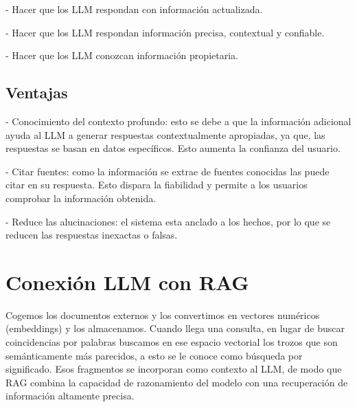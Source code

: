 - Hacer que los LLM respondan con información actualizada.

- Hacer que los LLM respondan información precisa, contextual y confiable.

- Hacer que los LLM conozcan información propietaria.

\subsection{Ventajas}

- Conocimiento del contexto profundo: esto se debe a que la información adicional ayuda al LLM a generar respuestas contextualmente apropiadas, ya que, las respuestas se basan en datos específicos. Esto aumenta la confianza del usuario.

- Citar fuentes: como la información se extrae de fuentes conocidas las puede citar en su respuesta. Esto dispara la fiabilidad y permite a los usuarios comprobar la información obtenida.

- Reduce las alucinaciones: el sistema esta anclado a los hechos, por lo que se reducen las respuestas inexactas o falsas. 

\section{Conexión LLM con RAG}

Cogemos los documentos externos y los convertimos en vectores numéricos (embeddings) y los almacenamos. Cuando llega una consulta, en lugar de buscar coincidencias por palabras buscamos en ese espacio vectorial los trozos que son semánticamente más parecidos, a esto se le conoce como búsqueda por significado. Esos fragmentos se incorporan como contexto al LLM, de modo que RAG combina la capacidad de razonamiento del modelo con una recuperación de información altamente precisa.
